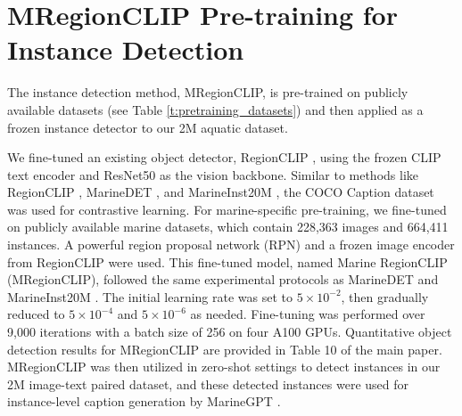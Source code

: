 \section{MRegionCLIP Pre-training for Instance Detection}
\label{mrgionclip}
The instance detection method, MRegionCLIP, is pre-trained on publicly available datasets (see Table \ref{t:pretraining_datasets}) and then applied as a frozen instance detector to our 2M aquatic dataset. 

We fine-tuned an existing object detector, RegionCLIP \cite{zhong2022regionclip}, using the frozen CLIP text encoder and ResNet50 as the vision backbone. 
Similar to methods like RegionCLIP \cite{zhong2022regionclip}, MarineDET \cite{haixin2023marinedet}, and MarineInst20M \cite{ziqiang2024marineinst}, the COCO Caption dataset was used for contrastive learning. 
For marine-specific pre-training, we fine-tuned on publicly available marine datasets, which contain 228,363 images and 664,411 instances.
A powerful region proposal network (RPN) and a frozen image encoder from RegionCLIP were used.
This fine-tuned model, named Marine RegionCLIP (MRegionCLIP), followed the same experimental protocols as MarineDET \cite{haixin2023marinedet} and MarineInst20M \cite{ziqiang2024marineinst}.
The initial learning rate was set to $5 \times 10^{-2}$, then gradually reduced to $5 \times 10^{-4}$ and $5 \times 10^{-6}$ as needed. 
Fine-tuning was performed over 9,000 iterations with a batch size of 256 on four A100 GPUs.
Quantitative object detection results for MRegionCLIP are provided in Table 10 of the main paper. 
MRegionCLIP was then utilized in zero-shot settings to detect instances in our 2M image-text paired dataset, and these detected instances were used for instance-level caption generation by MarineGPT \cite{zheng2023marinegpt}.

